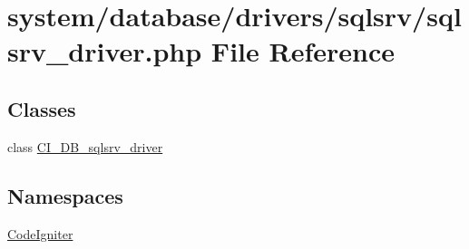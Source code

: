 \hypertarget{sqlsrv__driver_8php}{}\section{system/database/drivers/sqlsrv/sqlsrv\+\_\+driver.php File Reference}
\label{sqlsrv__driver_8php}
\subsection*{Classes}
\begin{DoxyCompactItemize}
\item 
class \mbox{\hyperlink{class_c_i___d_b__sqlsrv__driver}{C\+I\+\_\+\+D\+B\+\_\+sqlsrv\+\_\+driver}}
\end{DoxyCompactItemize}
\subsection*{Namespaces}
\begin{DoxyCompactItemize}
\item 
 \mbox{\hyperlink{namespace_code_igniter}{Code\+Igniter}}
\end{DoxyCompactItemize}
